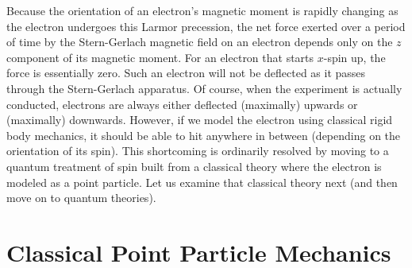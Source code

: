 \documentclass[onecolumn,secnumarabic,amsmath,amssymb,balancelastpage,nofootinbib]{article}
\begin{document}
Because the orientation of an electron's magnetic moment is rapidly changing as the electron undergoes this Larmor precession, the net force exerted over a period of time by the Stern-Gerlach magnetic field on an electron depends only on the $z$ component of its magnetic moment.  For an electron that starts $x$-spin up, the force is essentially zero.  Such an electron will not be deflected as it passes through the Stern-Gerlach apparatus.  Of course, when the experiment is actually conducted, electrons are always either deflected (maximally) upwards or (maximally) downwards.  However, if we model the electron using classical rigid body mechanics, it should be able to hit anywhere in between (depending on the orientation of its spin).  This shortcoming is ordinarily resolved by moving to a quantum treatment of spin built from a classical theory where the electron is modeled as a point particle.  Let us examine that classical theory next (and then move on to quantum theories).





\section{Classical Point Particle Mechanics}\label{pointparticlesection}
\end{document}
